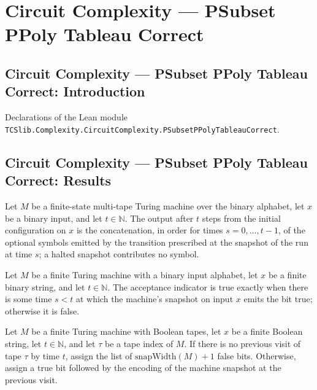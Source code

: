 \section{Circuit Complexity --- PSubset PPoly Tableau Correct}
\subsection*{Circuit Complexity --- PSubset PPoly Tableau Correct: Introduction}

Declarations of the Lean module \texttt{TCSlib.Complexity.CircuitComplexity.PSubsetPPolyTableauCorrect}.

\subsection*{Circuit Complexity --- PSubset PPoly Tableau Correct: Results}

\begin{theorem}
\label{Complexity.output_runFrom_eq_flatMap}
\leanok
{}
Let $M$ be a finite-state multi-tape Turing machine over the binary alphabet, let $x$ be
a binary input, and let $t\in\mathbb{N}$. The output after $t$ steps from the initial
configuration on $x$ is the concatenation, in order for times $s=0,\ldots,t-1$, of the
optional symbols emitted by the transition prescribed at the snapshot of the run at time
$s$; a halted snapshot contributes no symbol.
\end{theorem}

\begin{definition}
\label{Complexity.tableauAccepted}
\leanok
{}
Let $M$ be a finite Turing machine with a binary input alphabet, let $x$ be a finite
binary string, and let $t\in\mathbb{N}$. The acceptance indicator is true exactly when
there is some time $s<t$ at which the machine's snapshot on input $x$ emits the bit
true; otherwise it is false.
\end{definition}

\begin{definition}
\label{Complexity.idealTapeBits}
\leanok
{}
Let $M$ be a finite Turing machine with Boolean tapes, let $x$ be a finite Boolean
string, let $t\in\mathbb{N}$, and let $\tau$ be a tape index of $M$. If there is no
previous visit of tape $\tau$ by time $t$, assign the list of $\mathrm{snapWidth}(M)+1$
false bits. Otherwise, assign a true bit followed by the encoding of the machine
snapshot at the previous visit.
\end{definition}

